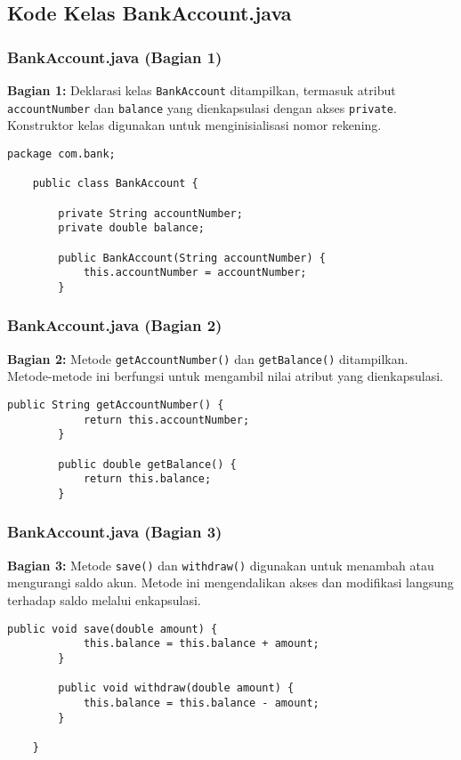 \documentclass[aspectratio=169, table]{beamer}
\begin{document}
\subsection{Kode Kelas BankAccount.java}

\begin{frame}[fragile]
\frametitle{BankAccount.java (Bagian 1)}
\textbf{Bagian 1:} Deklarasi kelas \texttt{BankAccount} ditampilkan, termasuk atribut \texttt{accountNumber} dan \texttt{balance} yang dienkapsulasi dengan akses \texttt{private}. Konstruktor kelas digunakan untuk menginisialisasi nomor rekening.
\begin{lstlisting}[style=JavaStyle]
	package com.bank;
	
	public class BankAccount {
		
		private String accountNumber;
		private double balance;
		
		public BankAccount(String accountNumber) {
			this.accountNumber = accountNumber;
		}
	\end{lstlisting}
\end{frame}

\begin{frame}[fragile]
	\frametitle{BankAccount.java (Bagian 2)}
	\textbf{Bagian 2:} Metode \texttt{getAccountNumber()} dan \texttt{getBalance()} ditampilkan. Metode-metode ini berfungsi untuk mengambil nilai atribut yang dienkapsulasi.
	\begin{lstlisting}[style=JavaStyle]
		public String getAccountNumber() {
			return this.accountNumber;
		}
		
		public double getBalance() {
			return this.balance;
		}
	\end{lstlisting}
\end{frame}

\begin{frame}[fragile]
	\frametitle{BankAccount.java (Bagian 3)}
	\textbf{Bagian 3:} Metode \texttt{save()} dan \texttt{withdraw()} digunakan untuk menambah atau mengurangi saldo akun. Metode ini mengendalikan akses dan modifikasi langsung terhadap saldo melalui enkapsulasi.
	\begin{lstlisting}[style=JavaStyle]
		public void save(double amount) {
			this.balance = this.balance + amount;
		}
		
		public void withdraw(double amount) {
			this.balance = this.balance - amount;
		}
		
	}
\end{lstlisting}
\end{frame}
\end{document}
